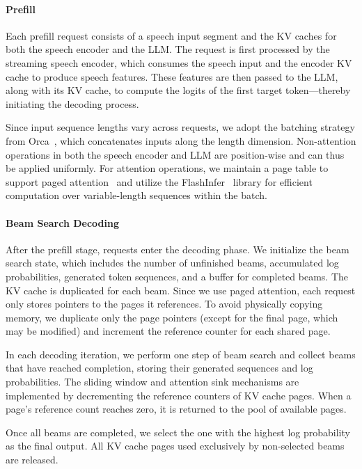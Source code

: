 \paragraph{Prefill}
Each prefill request consists of a speech input segment and the KV caches for both the speech encoder and the LLM. The request is first processed by the streaming speech encoder, which consumes the speech input and the encoder KV cache to produce speech features. These features are then passed to the LLM, along with its KV cache, to compute the logits of the first target token—thereby initiating the decoding process.

Since input sequence lengths vary across requests, we adopt the batching strategy from Orca~\cite{}, which concatenates inputs along the length dimension. Non-attention operations in both the speech encoder and LLM are position-wise and can thus be applied uniformly. For attention operations, we maintain a page table to support paged attention~\cite{} and utilize the FlashInfer~\cite{} library for efficient computation over variable-length sequences within the batch.

\paragraph{Beam Search Decoding} 
After the prefill stage, requests enter the decoding phase. We initialize the beam search state, which includes the number of unfinished beams, accumulated log probabilities, generated token sequences, and a buffer for completed beams. The KV cache is duplicated for each beam. Since we use paged attention, each request only stores pointers to the pages it references. To avoid physically copying memory, we duplicate only the page pointers (except for the final page, which may be modified) and increment the reference counter for each shared page.

In each decoding iteration, we perform one step of beam search and collect beams that have reached completion, storing their generated sequences and log probabilities. The sliding window and attention sink mechanisms are implemented by decrementing the reference counters of KV cache pages. When a page’s reference count reaches zero, it is returned to the pool of available pages.

Once all beams are completed, we select the one with the highest log probability as the final output. All KV cache pages used exclusively by non-selected beams are released.